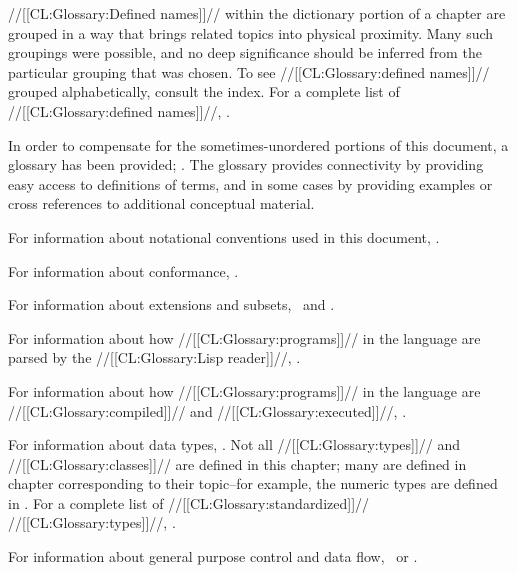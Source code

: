 //[[CL:Glossary:Defined names]]// within the dictionary portion of a chapter are grouped in a way that brings related topics into physical proximity. Many such groupings were possible, and no deep significance should be inferred from the particular grouping that was chosen. To see //[[CL:Glossary:defined names]]// grouped alphabetically, consult the index. For a complete list of //[[CL:Glossary:defined names]]//, \seesection\CLsymbols.

In order to compensate for the sometimes-unordered portions of this document,  a glossary has been provided; \seechapter\Glossary. The glossary provides connectivity by providing easy access to  definitions of terms, and in some cases by providing examples or  cross references to additional conceptual material.

For information about notational conventions used in this document, \seesection\Definitions.

For information about conformance, \seesection\Conformance. 

For information about extensions and subsets, \seesection\LanguageExtensions\ and \secref\LanguageSubsets.

For information about how //[[CL:Glossary:programs]]// in the language are parsed by the //[[CL:Glossary:Lisp reader]]//, \seechapter\Syntax.

For information about how //[[CL:Glossary:programs]]// in the language are //[[CL:Glossary:compiled]]// and //[[CL:Glossary:executed]]//, \seechapter\EvaluationAndCompilation.

For information about data types, \seechapter\TypesAndClasses. Not all //[[CL:Glossary:types]]// and //[[CL:Glossary:classes]]// are defined in this chapter; many are defined in chapter corresponding to their topic--for example, the numeric types are defined in \chapref\Numbers. For a complete list of //[[CL:Glossary:standardized]]// //[[CL:Glossary:types]]//,  \seefigure\StandardizedAtomicTypeSpecs.

For information about general purpose control and data flow, \seechapter\DataAndControlFlow\ or \chapref\Iteration.

\endSection%

 
\endSection%

 
\endSection%

